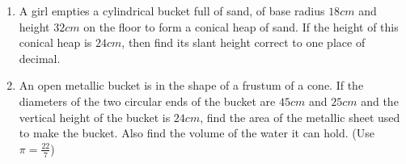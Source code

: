 \begin{enumerate}
\begin{figure}[H]
    \label{fig:Figpppr-3}
\end{figure}

\item A girl empties a cylindrical bucket full of sand, of base radius $18 cm$ and height $32 cm$ on the floor to form a conical heap of sand. If the height of this conical heap is $24 cm$, then find its slant height correct to one place of decimal.

\item An open metallic bucket is in the shape of a frustum of a cone. If the diameters of the two circular ends of the bucket are $45 cm$ and $25 cm$ and the vertical height of the bucket is $24 cm$, find the area of the metallic sheet used to make the bucket. Also find the volume of the water it can 
hold. (Use $\pi =\frac{22}{7}$)




\end{enumerate}
